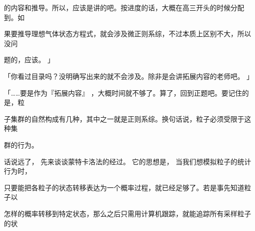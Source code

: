 的内容和推导。所以，应该是讲的吧。按进度的话，大概在高三开头的时候分配到。如\par
果要推导理想气体状态方程式，就会涉及微正则系综，不过本质上区别不大，所以没问\par
题的，应该。 」\par
「你看过目录吗？没明确写出来的就不会涉及。除非是会讲拓展内容的老师吧。 」\par
「……要是作为『拓展内容』 ，大概时间就不够了。算了，回到正题吧。要记住的是，粒\par
子集群的自然构成有几种，其中之一就是正则系综。换句话说，粒子必须受限于这种集\par
群的行为。\par
话说远了， 先来谈谈蒙特卡洛法的经过。 它的思想是， 当我们想模拟粒子的统计行为时，\par
只要能把各粒子的状态转移表达为一个概率过程，就已经足够了。若是事先知道粒子以\par
怎样的概率转移到特定状态，那么之后只需用计算机跟踪，就能追踪所有采样粒子的状\par

